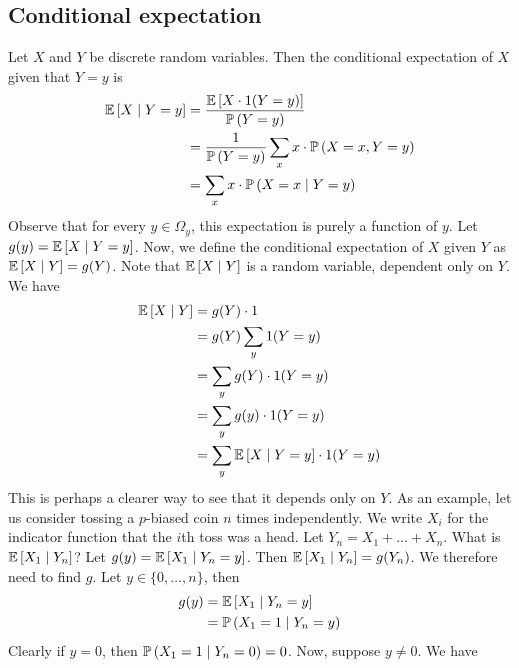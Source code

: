 \subsection{Conditional expectation}
Let \(X\) and \(Y\) be discrete random variables.
Then the conditional expectation of \(X\) given that \(Y = y\) is
\begin{align*}
	\mathbb{E}\left[{X \mid Y = y}\right] &= \frac{\mathbb{E}\left[{X \cdot 1(Y = y)}\right]}{\mathbb{P}\left({Y = y}\right)} \\
	&= \frac{1}{\mathbb{P}\left({Y = y}\right)} \sum_x x \cdot \mathbb{P}\left({X = x, Y = y}\right) \\
	&= \sum_x x \cdot \mathbb{P}\left({X = x \mid Y = y}\right)
\end{align*}
Observe that for every \(y \in \Omega_y\), this expectation is purely a function of \(y\).
Let \(g(y) = \mathbb{E}\left[{X \mid Y = y}\right]\).
Now, we define the conditional expectation of \(X\) given \(Y\) as \(\mathbb{E}\left[{X \mid Y}\right] = g(Y)\).
Note that \(\mathbb{E}\left[{X \mid Y}\right]\) is a random variable, dependent only on \(Y\).
We have
\begin{align*}
	\mathbb{E}\left[{X \mid Y}\right] & = g(Y) \cdot 1                                \\
	                  & = g(Y) \sum_y 1(Y = y)                        \\
	                  & = \sum_y g(Y) \cdot 1(Y = y)                  \\
	                  & = \sum_y g(y) \cdot 1(Y = y)                  \\
	                  & = \sum_y \mathbb{E}\left[{X \mid Y = y}\right] \cdot 1(Y = y)
\end{align*}
This is perhaps a clearer way to see that it depends only on \(Y\).
As an example, let us consider tossing a \(p\)-biased coin \(n\) times independently.
We write \(X_i\) for the indicator function that the \(i\)th toss was a head.
Let \(Y_n = X_1 + \dots + X_n\).
What is \(\mathbb{E}\left[{X_1 \mid Y_n}\right]\)?
Let \(g(y) = \mathbb{E}\left[{X_1 \mid Y_n = y}\right]\).
Then \(\mathbb{E}\left[{X_1 \mid Y_n}\right] = g(Y_n)\).
We therefore need to find \(g\).
Let \(y \in \{ 0, \dots, n \}\), then
\begin{align*}
	g(y) & = \mathbb{E}\left[{X_1 \mid Y_n = y}\right]   \\
	     & = \mathbb{P}\left({X_1 = 1 \mid Y_n = y}\right) \\
\end{align*}
Clearly if \(y = 0\), then \(\mathbb{P}\left({X_1 = 1 \mid Y_n = 0}\right) = 0\).
Now, suppose \(y \neq 0\).
We have
